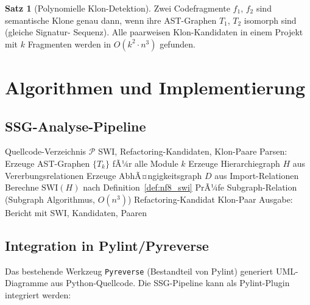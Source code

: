 ﻿\documentclass[a4paper,12pt]{scrreprt}
\theoremstyle{definition}
\newtheorem{satz}{Satz}[section]
\begin{document}
\begin{satz}[Polynomielle Klon-Detektion]
  Zwei Codefragmente $f_1$, $f_2$ sind semantische Klone genau dann,
  wenn ihre AST-Graphen $T_1$, $T_2$ isomorph sind (gleiche Signatur-
  Sequenz). Alle paarweisen Klon-Kandidaten in einem Projekt mit
  $k$ Fragmenten werden in $O(k^2 \cdot n^3)$ gefunden.
\end{satz}

\section{Algorithmen und Implementierung}

\subsection{SSG-Analyse-Pipeline}

\begin{algorithm}[H]
\caption{SSG-QualitÃ¤tsanalyse eines Softwareprojekts}
\label{alg:nf8}
\begin{algorithmic}[1]
\Require Quellcode-Verzeichnis $\mathcal{P}$
\Ensure SWI, Refactoring-Kandidaten, Klon-Paare
\State Parsen: Erzeuge AST-Graphen $\{T_k\}$ fÃ¼r alle Module $k$
\State Erzeuge Hierarchiegraph $H$ aus Vererbungsrelationen
\State Erzeuge AbhÃ¤ngigkeitsgraph $D$ aus Import-Relationen
\State Berechne $\mathrm{SWI}(H)$ nach Definition~\ref{def:nf8_swi}
  \State PrÃ¼fe Subgraph-Relation (Subgraph Algorithmus, $O(n^3)$)
    \State Refactoring-Kandidat
  \EndIf
    \State Klon-Paar
  \EndIf
\EndFor
\State Ausgabe: Bericht mit SWI, Kandidaten, Paaren
\end{algorithmic}
\end{algorithm}

\subsection{Integration in Pylint/Pyreverse}

Das bestehende Werkzeug \texttt{Pyreverse} (Bestandteil von Pylint)
generiert UML-Diagramme aus Python-Quellcode. Die SSG-Pipeline
kann als Pylint-Plugin integriert werden:
\end{document}
